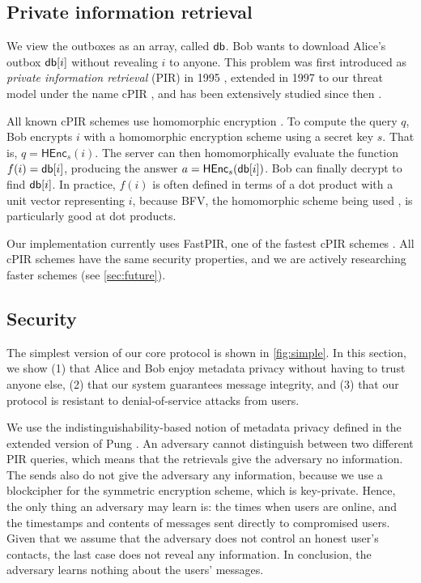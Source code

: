 \subsection{Private information retrieval}

We view the outboxes as an array, called $\mathsf{db}$. Bob wants to download Alice's outbox $\mathsf{db}[i]$ without revealing $i$ to anyone. This problem was first introduced as \textit{private information retrieval} (PIR) in 1995 \cite{chor1995private}, extended in 1997 to our threat model under the name cPIR \cite{kushilevitz1997replication}, and has been extensively studied since then \cite{melchor2016xpir,angel2018pir, ahmad2021addra}.

All known cPIR schemes use homomorphic encryption \cite{gentry2010computing}. To compute the query $q$, Bob encrypts $i$ with a homomorphic encryption scheme using a secret key $s$. That is, $q = \mathsf{HEnc}_s(i)$. The server can then homomorphically evaluate the function $f(i) = \mathsf{db}[i]$, producing the answer $a = \mathsf{HEnc}_s(\mathsf{db}[i])$. Bob can finally decrypt to find $\mathsf{db}[i]$. In practice, $f(i)$ is often defined in terms of a dot product with a unit vector representing $i$, because BFV, the homomorphic scheme being used \cite{fan2012somewhat}, is particularly good at dot products.

Our implementation currently uses FastPIR, one of the fastest cPIR schemes \cite{ahmad2021addra}. All cPIR schemes have the same security properties, and we are actively researching faster schemes (see \cref{sec:future}).

\subsection{Security}
\label{subsec:core-security}

The simplest version of our core protocol is shown in \cref{fig:simple}. In this section, we show (1) that Alice and Bob enjoy metadata privacy without having to trust anyone else, (2) that our system guarantees message integrity, and (3) that our protocol is resistant to denial-of-service attacks from users. 

We use the indistinguishability-based notion of metadata privacy defined in the extended version of Pung \cite{angel2016unobservable}. An adversary cannot distinguish between two different PIR queries, which means that the retrievals give the adversary no information. The sends also do not give the adversary any information, because we use a blockcipher for the symmetric encryption scheme, which is key-private. Hence, the only thing an adversary may learn is: the times when users are online, and the timestamps and contents of messages sent directly to compromised users. Given that we assume that the adversary does not control an honest user's contacts, the last case does not reveal any information. In conclusion, the adversary learns nothing about the users' messages.

